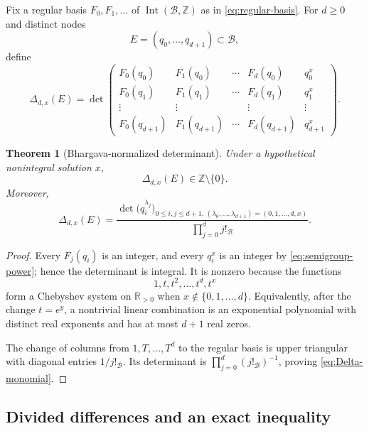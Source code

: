\documentclass[11pt,oneside]{article}
\newtheorem{theorem}{Theorem}[section]
\theoremstyle{definition}
\theoremstyle{remark}
\newcommand{\Z}{\mathbb Z}
\newcommand{\R}{\mathbb R}
\newcommand{\B}{\mathcal B}
\newcommand{\Int}{\operatorname{Int}}
\begin{document}
Fix a regular basis \(F_0,F_1,\ldots\) of \(\Int(\B,\Z)\) as in
\eqref{eq:regular-basis}.  For \(d\ge0\) and distinct nodes
\[
 E=(q_0,\ldots,q_{d+1})\subset\B,
\]
define
\begin{equation}
 \Delta_{d,x}(E)
 =
 \det
 \begin{pmatrix}
 F_0(q_0)&F_1(q_0)&\cdots&F_d(q_0)&q_0^x\\
 F_0(q_1)&F_1(q_1)&\cdots&F_d(q_1)&q_1^x\\
 \vdots&\vdots&&\vdots&\vdots\\
 F_0(q_{d+1})&F_1(q_{d+1})&\cdots&F_d(q_{d+1})&q_{d+1}^x
 \end{pmatrix}.
 \label{eq:Delta-def}
\end{equation}

\begin{theorem}[Bhargava-normalized determinant]
\label{thm:normalized-determinant}
Under a hypothetical nonintegral solution \(x\),
\begin{equation}
 \boxed{\Delta_{d,x}(E)\in\Z\setminus\{0\}.}
 \label{eq:Delta-integer}
\end{equation}
Moreover,
\begin{equation}
 \Delta_{d,x}(E)
 =
 \frac{
 \det\bigl(q_i^{\lambda_j}\bigr)_{
 0\le i,j\le d+1,\,
 (\lambda_0,\ldots,\lambda_{d+1})=(0,1,\ldots,d,x)}
 }{\displaystyle\prod_{j=0}^{d}j!_{\B}}.
 \label{eq:Delta-monomial}
\end{equation}
\end{theorem}

\begin{proof}
Every \(F_j(q_i)\) is an integer, and every \(q_i^x\) is an integer by
\eqref{eq:semigroup-power}; hence the determinant is integral.  It is nonzero because the
functions
\[
 1,t,t^2,\ldots,t^d,t^x
\]
form a Chebyshev system on \(\R_{>0}\) when \(x\notin\{0,1,\ldots,d\}\).  Equivalently, after
the change \(t=e^y\), a nontrivial linear combination is an exponential polynomial with
distinct real exponents and has at most \(d+1\) real zeros.

The change of columns from \(1,T,\ldots,T^d\) to the regular basis is upper triangular with
diagonal entries \(1/j!_{\B}\).  Its determinant is
\(\prod_{j=0}^{d}(j!_{\B})^{-1}\), proving \eqref{eq:Delta-monomial}.
\end{proof}

\subsection{Divided differences and an exact inequality}
\end{document}
